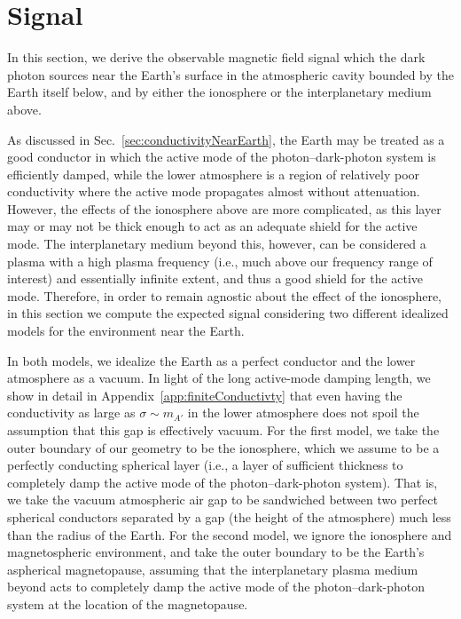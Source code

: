 \documentclass[amsmath,amssymb,aps,10pt,prd,letterpaper,nofootinbib,balancelastpage,notitlepage,superscriptaddress,twocolumn,floatfix]{revtex4-2}
\newcommand{\secref}[2][]{Sec{#1}.~\ref{#2}}		%
\newcommand{\appref}[2][x]{Appendi{#1}~\ref{#2}}	%
\begin{document}
\section{Signal}
\label{sec:signal}

In this section, we derive the observable magnetic field signal which the dark photon sources near the Earth's surface in the atmospheric cavity bounded by the Earth itself below, and by either the ionosphere or the interplanetary medium above.

As discussed in \secref{sec:conductivityNearEarth}, the Earth may be treated as a good conductor in which the active mode of the photon--dark-photon system is efficiently damped, while the lower atmosphere is a region of relatively poor conductivity where the active mode propagates almost without attenuation.
However, the effects of the ionosphere above are more complicated, as this layer may or may not be thick enough to act as an adequate shield for the active mode.
The interplanetary medium beyond this, however, can be considered a plasma with a high plasma frequency (i.e., much above our frequency range of interest) and essentially infinite extent, and thus a good shield for the active mode.
Therefore, in order to remain agnostic about the effect of the ionosphere, in this section we compute the expected signal considering two different idealized models for the environment near the Earth.

In both models, we idealize the Earth as a perfect conductor and the lower atmosphere as a vacuum.
In light of the long active-mode damping length, we show in detail in \appref{app:finiteConductivty} that even having the conductivity as large as $\sigma \sim m_{A'}$ in the lower atmosphere does not spoil the assumption that this gap is effectively vacuum.
For the first model, we take the outer boundary of our geometry to be the ionosphere, which we assume to be a perfectly conducting spherical layer (i.e., a layer of sufficient thickness to completely damp the active mode of the photon--dark-photon system).
That is, we take the vacuum atmospheric air gap to be sandwiched between two perfect spherical conductors separated by a gap (the height of the atmosphere) much less than the radius of the Earth.
For the second model, we ignore the ionosphere and magnetospheric environment, and take the outer boundary to be the Earth's aspherical magnetopause, assuming that the interplanetary plasma medium beyond acts to completely damp the active mode of the photon--dark-photon system at the location of the magnetopause.
\end{document}
